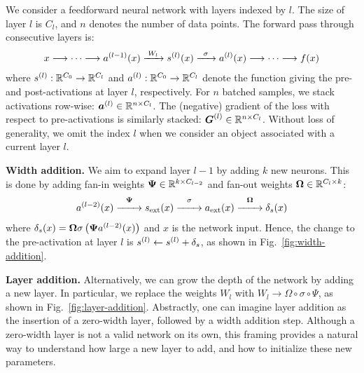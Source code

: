 
We consider a feedforward neural network with layers indexed by $l$. The size of layer $l$ is $C_l$, and $n$ denotes the number of data points. The forward pass through consecutive layers is:
\begin{align}
    x \longrightarrow \dots \longrightarrow \postact[l-1](x) \xrightarrow{\;W_l\;} \preact[l](x) \xrightarrow{\;\;\sigma\;\;} \postact[l](x)  \longrightarrow \dots \longrightarrow f(x)
\end{align}
where $\preact[l]: \mathbb{R}^{C_0} \to \mathbb{R}^{C_l}$ and $\postact[l]: \mathbb{R}^{C_0} \to \mathbb{R}^{C_l}$ denote the function giving the pre- and post-activations at layer $l$, respectively. 
For $n$ batched samples, we stack activations row-wise: $\Postact[l] \in \mathbb{R}^{n \times C_l}$. The (negative) gradient of the loss with respect to pre-activations is similarly stacked: $\Gradpreact^{(l)} \in \mathbb{R}^{n \times C_{l}}$.
Without loss of generality, we omit the index $l$ when we consider an object associated with a current layer $l$.

\textbf{Width addition.} We aim to expand layer $l-1$ by adding $k$ new neurons. This is done by adding fan-in weights $\Fanin \in \mathbb{R}^{k \times C_{l-2}}$ and fan-out weights $\Fanout \in \mathbb{R}^{C_l \times k}$:
\begin{align}
    \postact[l-2](x) \overset{\Fanin}{\xrightarrow{\hspace{2em}}} \preactext(x) \overset{\sigma}{\xrightarrow{\hspace{2em}}} \postactext(x) \overset{\Fanout}{\xrightarrow{\hspace{2em}}} \deltas(x)
\end{align}
where $\deltas(x) =  \Fanout \sigma \left(\Fanin \postact[l-2](x) \right)$ and $x$ is the network input.
Hence, the change to the pre-activation at layer $l$ is $\preact[l] \leftarrow \preact[l] + \deltas$, as shown in Fig.~\ref{fig:width-addition}.

\textbf{Layer addition.} Alternatively, we can grow the depth of the network by adding a new layer. In particular, we replace the weights $W_l$ with $W_l \to \Omega \circ \sigma \circ \Psi$, as shown in Fig.~\ref{fig:layer-addition}. Abstractly, one can imagine layer addition as the insertion of a zero-width layer, followed by a width addition step. Although a zero-width layer is not a valid network on its own, this framing provides a natural way to understand how large a new layer to add, and how to initialize these new parameters.

